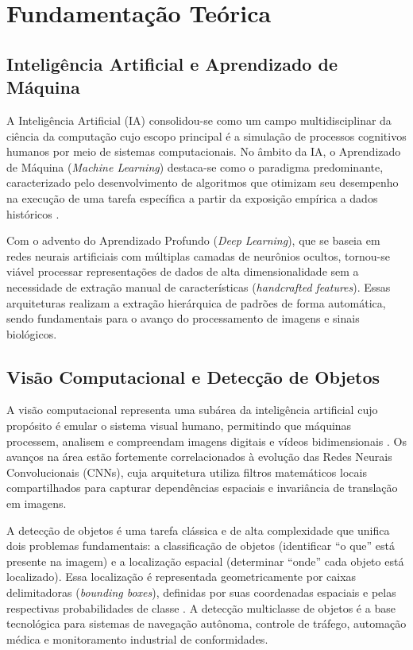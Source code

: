 \chapter{Fundamentação Teórica}
\label{chap:fundamentacao}

\section{Inteligência Artificial e Aprendizado de Máquina}
A Inteligência Artificial (IA) consolidou-se como um campo multidisciplinar da ciência da computação cujo escopo principal é a simulação de processos cognitivos humanos por meio de sistemas computacionais. No âmbito da IA, o Aprendizado de Máquina (\textit{Machine Learning}) destaca-se como o paradigma predominante, caracterizado pelo desenvolvimento de algoritmos que otimizam seu desempenho na execução de uma tarefa específica a partir da exposição empírica a dados históricos \cite{goodfellow2016deep}. 

Com o advento do Aprendizado Profundo (\textit{Deep Learning}), que se baseia em redes neurais artificiais com múltiplas camadas de neurônios ocultos, tornou-se viável processar representações de dados de alta dimensionalidade sem a necessidade de extração manual de características (\textit{handcrafted features}). Essas arquiteturas realizam a extração hierárquica de padrões de forma automática, sendo fundamentais para o avanço do processamento de imagens e sinais biológicos.

\section{Visão Computacional e Detecção de Objetos}
A visão computacional representa uma subárea da inteligência artificial cujo propósito é emular o sistema visual humano, permitindo que máquinas processem, analisem e compreendam imagens digitais e vídeos bidimensionais \cite{goodfellow2016deep}. Os avanços na área estão fortemente correlacionados à evolução das Redes Neurais Convolucionais (CNNs), cuja arquitetura utiliza filtros matemáticos locais compartilhados para capturar dependências espaciais e invariância de translação em imagens.

A detecção de objetos é uma tarefa clássica e de alta complexidade que unifica dois problemas fundamentais: a classificação de objetos (identificar ``o que'' está presente na imagem) e a localização espacial (determinar ``onde'' cada objeto está localizado). Essa localização é representada geometricamente por caixas delimitadoras (\textit{bounding boxes}), definidas por suas coordenadas espaciais e pelas respectivas probabilidades de classe \cite{redmon2016you}. A detecção multiclasse de objetos é a base tecnológica para sistemas de navegação autônoma, controle de tráfego, automação médica e monitoramento industrial de conformidades.

